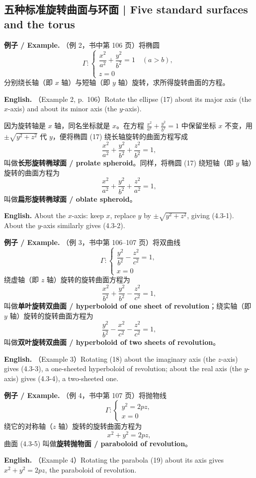 \documentclass[UTF8,11pt,a4paper]{ctexart}
\newcommand{\EN}[1]{\par\noindent \textbf{English.} #1\par}
\newcommand{\EX}[2]{\par\noindent \textbf{例子 / Example.} #1\par\EN{#2}}
\theoremstyle{definition}
\begin{document}
\subsection{五种标准旋转曲面与环面 | Five standard surfaces and the torus}
\EX{（例 2，书中第 106 页）将椭圆
\[
\Gamma:\begin{cases}\dfrac{x^2}{a^2}+\dfrac{y^2}{b^2}=1\quad(a>b),\\ z=0\end{cases}\tag{17}
\]
分别绕长轴（即 $x$ 轴）与短轴（即 $y$ 轴）旋转，求所得旋转曲面的方程。}{（Example 2, p.~106）Rotate the ellipse (17) about its major axis (the $x$-axis) and about its minor axis (the $y$-axis).}
因为旋转轴是 $x$ 轴，同名坐标就是 $x$。在方程 $\frac{x^2}{a^2}+\frac{y^2}{b^2}=1$ 中保留坐标 $x$ 不变，用 $\pm\sqrt{y^2+z^2}$ 代 $y$，便将椭圆 (17) 绕长轴旋转的曲面方程写成
\[
\frac{x^2}{a^2}+\frac{y^2}{b^2}+\frac{z^2}{b^2}=1,\tag{4.3-1}
\]
叫做\textbf{长形旋转椭球面 / prolate spheroid}。同样，将椭圆 (17) 绕短轴（即 $y$ 轴）旋转的曲面方程为
\[
\frac{x^2}{a^2}+\frac{y^2}{b^2}+\frac{z^2}{a^2}=1,\tag{4.3-2}
\]
叫做\textbf{扁形旋转椭球面 / oblate spheroid}。
\EN{About the $x$-axis: keep $x$, replace $y$ by $\pm\sqrt{y^2+z^2}$, giving (4.3-1). About the $y$-axis similarly gives (4.3-2).}

\EX{（例 3，书中第 106--107 页）将双曲线
\[
\Gamma:\begin{cases}\dfrac{y^2}{b^2}-\dfrac{z^2}{c^2}=1,\\ x=0\end{cases}\tag{18}
\]
绕虚轴（即 $z$ 轴）旋转的旋转曲面方程为
\[
\frac{x^2}{b^2}+\frac{y^2}{b^2}-\frac{z^2}{c^2}=1,\tag{4.3-3}
\]
叫做\textbf{单叶旋转双曲面 / hyperboloid of one sheet of revolution}；绕实轴（即 $y$ 轴）旋转的旋转曲面方程为
\[
\frac{y^2}{b^2}-\frac{x^2}{c^2}-\frac{z^2}{c^2}=1,\tag{4.3-4}
\]
叫做\textbf{双叶旋转双曲面 / hyperboloid of two sheets of revolution}。}{（Example 3）Rotating (18) about the imaginary axis (the $z$-axis) gives (4.3-3), a one-sheeted hyperboloid of revolution; about the real axis (the $y$-axis) gives (4.3-4), a two-sheeted one.}

\EX{（例 4，书中第 107 页）将抛物线
\[
\Gamma:\begin{cases}y^2=2pz,\\ x=0\end{cases}\tag{19}
\]
绕它的对称轴（$z$ 轴）旋转的旋转曲面方程为
\[
x^2+y^2=2pz,\tag{4.3-5}
\]
曲面 (4.3-5) 叫做\textbf{旋转抛物面 / paraboloid of revolution}。}{（Example 4）Rotating the parabola (19) about its axis gives $x^2+y^2=2pz$, the paraboloid of revolution.}
\end{document}
